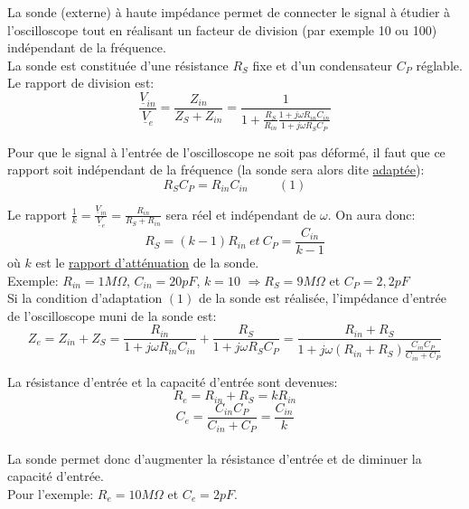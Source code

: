 {%
La sonde (externe) à haute impédance permet de connecter le signal à étudier à l'oscilloscope tout en réalisant un facteur de division (par exemple 10 ou 100) indépendant de la fréquence.\\
La sonde est constituée d'une résistance $R_S$ fixe et d'un condensateur $C_P$ réglable.\\

Le rapport de division est:\\
$$\frac{\underline{V}_{in}}{\underline{V}_e}=\frac{Z_{in}}{Z_S+Z_{in}}=\frac{1}{1+\frac{R_S}{R_{in}}\frac{1+j\omega R_{in}C_{in}}{1+j\omega R_{S}C_{P}}}$$

Pour que le signal à l'entrée de l'oscilloscope ne soit pas déformé, il faut que ce rapport soit indépendant de la fréquence (la sonde sera alors dite \underline{adaptée}):\\
$$R_SC_P=R_{in}C_{in} \hspace{1cm} (1)$$

Le rapport $\frac{1}{k}=\frac{\underline{V}_{in}}{\underline{V}_e}=\frac{R_{in}}{R_S+R_{in}}$ sera réel et indépendant de $\omega$. On aura donc:\\
$$R_S=(k-1)R_{in} \ et \ C_P=\frac{C_{in}}{k-1}$$
où $k$ est le \underline{rapport d'atténuation} de la sonde.\\

Exemple: $R_{in}=1M\Omega$, $C_{in}=20pF$, $k=10$ $\Rightarrow R_S=9M\Omega$ et $C_P=2,2pF$\\

Si la condition d'adaptation $(1)$ de la sonde est réalisée, l'impédance d'entrée de l'oscilloscope muni de la sonde est:\\
$$Z_e=Z_{in}+Z_S=\frac{R_{in}}{1+j\omega R_{in}C_{in}}+\frac{R_{S}}{1+j\omega R_{S}C_{P}}=\frac{R_{in}+R_S}{1+j\omega (R_{in}+R_S) \frac{C_{in}C_P}{C_{in}+C_P}}$$

La résistance d'entrée et la capacité d'entrée sont devenues:\\
$$R_e=R_{in}+R_S=kR_{in}$$
$$C_e=\frac{C_{in}C_P}{C_{in}+C_P}=\frac{C_{in}}{k}$$\\

La sonde permet donc d'augmenter la résistance d'entrée et de diminuer la capacité d'entrée.\\

Pour l'exemple: $R_e=10M\Omega$ et $C_e=2pF$.
}
{}

